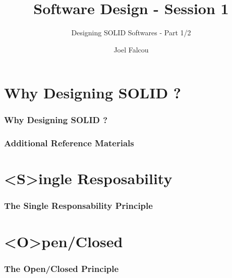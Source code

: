 \documentclass{beamer}
\title{Software Design - Session 1}
\subtitle{Designing SOLID Softwares  - Part 1/2}
\author{Joel Falcou}
\institute{Laboratoire de Recherche en Informatique - Université Paris Sud 11}
\date{}
\begin{document}
\begin{frame}[plain]
\titlepage
\end{frame}
\section{Why Designing SOLID ?}
\frame
{
  \frametitle{Why Designing SOLID ?}
  \begin{center}\end{center}
}

\frame
{

}

\frame
{
  \frametitle{Additional Reference Materials}
}

\section{<S>ingle Resposability}
\frame
{
  \frametitle{The Single Responsability Principle}
  \begin{center}\end{center}
}

\frame
{

}

\section{<O>pen/Closed}
\frame
{
  \frametitle{The Open/Closed Principle}
  \begin{center}\end{center}
}

\frame{}
\end{document}
